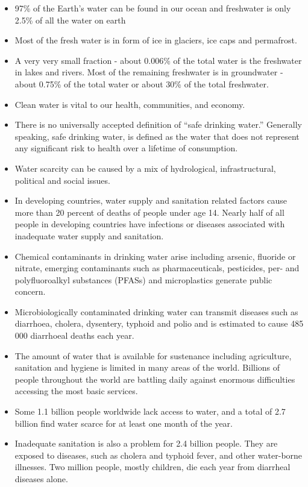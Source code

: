 \begin{itemize}
\item 97\% of the Earth's water can be found in our ocean and freshwater is only 2.5\% of all the water on earth
\item Most of the fresh water is in form of ice in glaciers, ice caps and permafrost.  
\item A very very small fraction - about 0.006\% of the total water is the freshwater in lakes and rivers.  Most of the remaining freshwater is in groundwater - about 0.75\% of the total water or about 30\% of the total freshwater.
\item Clean water is vital to our health, communities, and economy. 
\item There is no universally accepted definition of “safe drinking water.” Generally speaking, safe drinking water, is defined as the water that does not represent any significant risk to health over a lifetime of consumption.
\item Water scarcity can be caused by a mix of hydrological, infrastructural, political and social issues. 
\item In developing countries, water supply and sanitation related factors cause more than 20 percent of deaths of people under age 14. Nearly
half of all people in developing countries have infections or diseases associated with inadequate water supply and sanitation.
\item Chemical contaminants in drinking water arise including arsenic, fluoride or nitrate, emerging contaminants such as pharmaceuticals, pesticides, per- and polyfluoroalkyl substances (PFASs) and microplastics generate public concern.
\item Microbiologically contaminated drinking water can transmit diseases such as diarrhoea, cholera, dysentery, typhoid and polio and is estimated to cause 485 000 diarrhoeal deaths each year.
\item The amount of water that is available for sustenance including agriculture, sanitation and hygiene is limited in many areas of the world.  Billions of people throughout the world are battling daily against enormous difficulties accessing the most basic services.\\
\item Some 1.1 billion people worldwide lack access to water, and a total of 2.7 billion find water scarce for at least one month of the year.
\item Inadequate sanitation is also a problem for 2.4 billion people.  They are exposed to diseases, such as cholera and typhoid fever, and other water-borne illnesses. Two million people, mostly children, die each year from diarrheal diseases alone.\\

\end{itemize}

